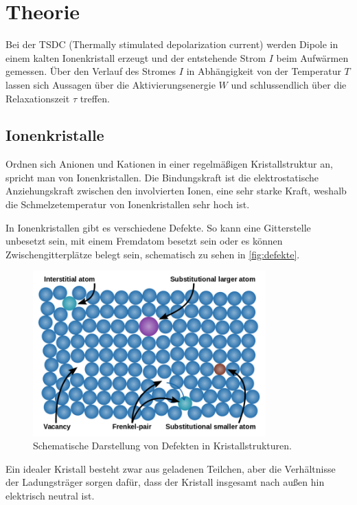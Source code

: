 \section{Theorie}
\label{sec:Theorie}

Bei der TSDC (Thermally stimulated depolarization current) werden Dipole in einem kalten Ionenkristall erzeugt
und der entstehende Strom $I$ beim Aufwärmen gemessen. Über den Verlauf des Stromes $I$ in Abhängigkeit von der Temperatur $T$
 lassen sich Aussagen über die Aktivierungsenergie $W$ und schlussendlich über die Relaxationszeit $\tau$ treffen.

\subsection{Ionenkristalle}
Ordnen sich Anionen und Kationen in einer regelmäßigen Kristallstruktur an, spricht man von Ionenkristallen.
Die Bindungskraft ist die elektrostatische Anziehungskraft zwischen den involvierten Ionen, eine sehr starke Kraft, weshalb die Schmelzetemperatur 
von Ionenkristallen sehr hoch ist. 

In Ionenkristallen gibt es verschiedene Defekte. So kann eine Gitterstelle unbesetzt sein, mit einem Fremdatom besetzt sein oder es können Zwischengitterplätze belegt sein, schematisch zu sehen in
\autoref{fig:defekte}.

\begin{figure}[H]
    \centering
    \includegraphics[width=0.8\textwidth]{Bilder/bild.png}
    \caption{Schematische Darstellung von Defekten in Kristallstrukturen.}
    \label{fig:defekte}
\end{figure}

Ein idealer Kristall besteht zwar aus geladenen Teilchen, aber die Verhältnisse der Ladungsträger sorgen dafür, dass der Kristall
insgesamt nach außen hin elektrisch neutral ist.

